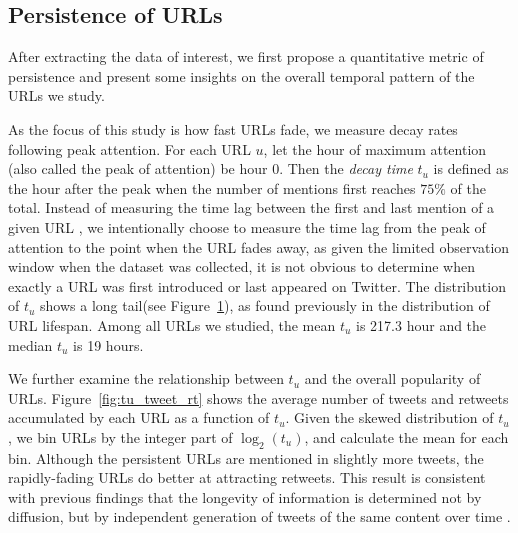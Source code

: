 \documentclass[phd,tocprelim]{cornell}
\renewcommand{\caption}[1]{\singlespacing\hangcaption{#1}\normalspacing}
\begin{document}
\subsection{Persistence of URLs}
After extracting the data of interest, we first propose a quantitative metric of persistence and present some insights on the overall temporal pattern of the URLs we study.

As the focus of this study is how fast URLs fade, we measure decay rates following peak attention. 
For each URL $u$, let the hour of maximum attention (also called
the peak of attention) be hour $0$. 
Then the {\em decay time} $t_u$ is defined as the hour after the peak 
when the number of mentions first reaches $75\%$ of the total.
Instead of measuring the time lag between the first and last mention of a given URL \cite{Wu-Twitter-2011}, we intentionally choose to measure the time lag from the peak of attention to the point when the URL fades away, as given the limited observation window when the dataset was collected, it is not obvious to determine when exactly a URL was first introduced or last appeared on Twitter.
The distribution of $t_u$ shows a long tail(see Figure~\ref{fig:tu_distribution}), as found previously in the distribution of URL lifespan\cite{Wu-Twitter-2011}.
Among all URLs we studied, the mean $t_u$ is 217.3  hour and the median $t_u$ is 19 hours.

\begin{figure}[htb!]
\centering
{}
\caption{Distribution of URL decay time $t_u$}
\label{fig:tu_distribution}
\end{figure}

We further examine the relationship between $t_u$ and the overall popularity of URLs. Figure~\ref{fig:tu_tweet_rt} shows the average number of tweets and retweets accumulated by each URL as a function of $t_u$. Given the skewed distribution of $t_u$, we bin URLs by the integer part of $\log_2(t_u)$, and calculate the mean for each bin.  Although the persistent URLs are mentioned in slightly more tweets, the rapidly-fading URLs do better at attracting retweets. This result is consistent with previous findings that the longevity of information is determined not by diffusion, but by independent generation of tweets of the same content over time \cite{Wu-Twitter-2011}.
\end{document}
